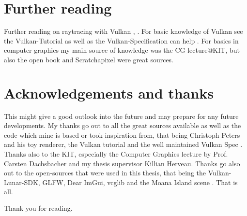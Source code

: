 \section{Further reading}
Further reading on raytracing with Vulkan \cite{vulkanNvidia}, \cite{vulkanRayTracing}. For basic knowledge of Vulkan see the Vulkan-Tutorial \cite{vulkanTutorial} as well as the Vulkan-Specification can help \cite{vulkanSpec}. For basics in computer graphics my main source of knowledge was the CG lecture@KIT, but also the open book \cite{pbrBook} and Scratchapixel \cite{scrathAPixel} were great sources.

\section{Acknowledgements and thanks}
This might give a good outlook into the future and may prepare for any future developments. My thanks go out to all the great sources available as well as the code which mine is based or took inspiration from, that being Christoph Peters \cite{momentsingraphics} and his toy renderer, the Vulkan tutorial \cite{vulkanTutorial}and the well maintained Vulkan Spec \cite{vulkanSpec}. Thanks also to the KIT, especially the Computer Graphics lecture by Prof. Carsten Dachsbacher and my thesis supervisor Killian Herveau.  Thanks go also out to the open-sources that were used in this thesis, that being the Vulkan-Lunar-SDK, GLFW, Dear ImGui, vcglib and the Moana Island scene \cite{moanaIsland}. That is all.

\begin{center}
    Thank you for reading.
\end{center}